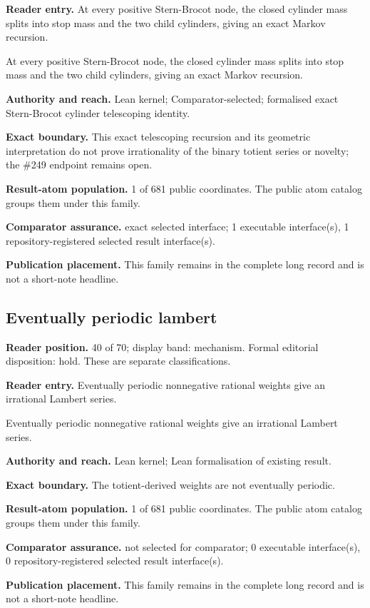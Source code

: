 \textbf{Reader entry.} At every positive Stern-Brocot node, the closed cylinder mass splits into stop mass and the two child cylinders, giving an exact Markov recursion.

At every positive Stern-Brocot node, the closed cylinder mass splits into stop mass and the two child cylinders, giving an exact Markov recursion.

\textbf{Authority and reach.} Lean kernel; Comparator-selected; formalised exact Stern-Brocot cylinder telescoping identity.

\textbf{Exact boundary.} This exact telescoping recursion and its geometric interpretation do not prove irrationality of the binary totient series or novelty; the \#249 endpoint remains open.

\textbf{Result-atom population.} 1 of 681 public coordinates. The public atom catalog groups them under this family.

\textbf{Comparator assurance.} exact selected interface; 1 executable interface(s), 1 repository-registered selected result interface(s).

\textbf{Publication placement.} This family remains in the complete long record and is not a short-note headline.

\subsection{Eventually periodic lambert}
\textbf{Reader position.} 40 of 70; display band: mechanism.  Formal editorial disposition: hold.  These are separate classifications.

\textbf{Reader entry.} Eventually periodic nonnegative rational weights give an irrational Lambert series.

Eventually periodic nonnegative rational weights give an irrational Lambert series.

\textbf{Authority and reach.} Lean kernel; Lean formalisation of existing result.

\textbf{Exact boundary.} The totient-derived weights are not eventually periodic.

\textbf{Result-atom population.} 1 of 681 public coordinates. The public atom catalog groups them under this family.

\textbf{Comparator assurance.} not selected for comparator; 0 executable interface(s), 0 repository-registered selected result interface(s).

\textbf{Publication placement.} This family remains in the complete long record and is not a short-note headline.

